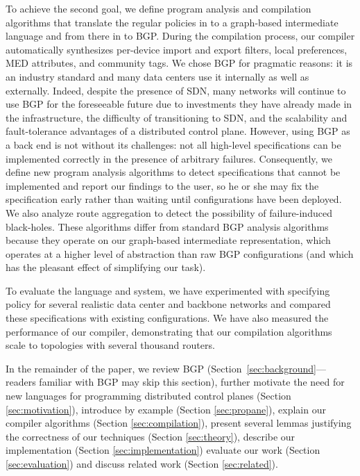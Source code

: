 To achieve the second goal, we define program analysis and compilation
algorithms that translate the regular policies in to a graph-based
intermediate language and from there in to BGP.  During the
compilation process, our compiler automatically synthesizes per-device
import and export filters, local preferences, MED attributes, and 
community tags.  We chose BGP for pragmatic reasons:  it is an industry
standard and many data centers use it internally as well as externally.
Indeed, despite the presence of SDN, many networks will continue to
use BGP for the foreseeable future due to investments they have already
made in the infrastructure, the difficulty of transitioning to SDN,
and the scalability and fault-tolerance advantages of a distributed
control plane.  However, using BGP as a back end is not without its 
challenges: not all high-level specifications can be implemented correctly in
the presence of arbitrary failures.  Consequently, we define new
program analysis algorithms to detect specifications that cannot be implemented
and report our findings to the user, so he or she may fix the specification
early rather than waiting until configurations have been deployed.  We also
analyze route aggregation to detect the possibility of failure-induced black-holes.
These algorithms differ from
standard BGP analysis algorithms~\cite{feamster:rcc,batfish} because they operate on 
our graph-based intermediate representation, which operates at a higher level
of abstraction than raw BGP configurations (and which has the pleasant effect of simplifying our 
task).

To evaluate the \sysname{} language and system, we have experimented with specifying policy
for several realistic data center and backbone networks and compared these specifications
with existing configurations. We have also
measured the performance of our compiler, demonstrating that our compilation
algorithms scale to topologies with several thousand routers.

In the remainder of the paper, we review BGP (Section~\ref{sec:background}---readers
familiar with BGP may skip this section),
further motivate the need for new languages 
for programming distributed control planes (Section \ref{sec:motivation}),
introduce \sysname{} by example (Section \ref{sec:propane}), 
explain our compiler algorithms (Section \ref{sec:compilation}),
present several lemmas justifying the correctness of our techniques (Section \ref{sec:theory}), describe our implementation (Section \ref{sec:implementation})
evaluate our work  (Section \ref{sec:evaluation}) and discuss related work (Section \ref{sec:related}).

